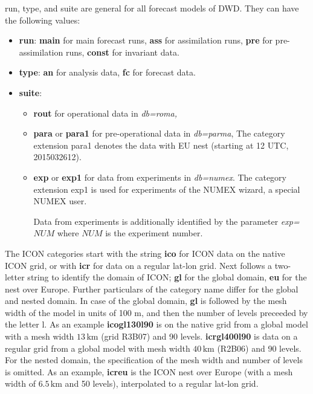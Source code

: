 run, type, and suite are general for all forecast models of DWD. They can have the 
following values:
\begin{itemize}
 \item \textbf{run}: \textbf{main} for main forecast runs,
                     \textbf{ass} for assimilation runs,
                     \textbf{pre} for pre-assimilation runs,
                     \textbf{const} for invariant data.
 \item \textbf{type}: \textbf{an} for analysis data,
                      \textbf{fc} for forecast data.
 \item \textbf{suite}: 
       \begin{itemize}
         \item \textbf{rout} for operational data in \emph{db=roma,}
         \item \textbf{para} or \textbf{para1} for pre-operational data in \emph{db=parma},
                       The category extension para1 denotes the data with EU nest
                       (starting at 12 UTC, 2015032612).
         \item \textbf{exp} or \textbf{exp1} for data from experiments in
                       \emph{db=numex}. The category extension exp1 is used for
                       experiments of the NUMEX wizard, a special NUMEX user.

                       Data from experiments is additionally
                       identified by the parameter \emph{exp=}$NUM$ where $NUM$ is
                       the experiment number.
       \end{itemize}
\end{itemize}

The ICON categories start with the string \textbf{ico} for ICON data on 
the native ICON grid, or with \textbf{icr} for data on a regular lat-lon grid.
Next follows a two-letter string to identify the domain of ICON; \textbf{gl} for the
global domain, \textbf{eu} for the nest over Europe. Further particulars of the category 
name differ for the global and nested domain. In case of the global domain, \textbf{gl} 
is followed by the mesh width of the model in units of 100 m, and then the number of levels 
preceeded by the letter l. As an example \textbf{icogl130l90} is on the native grid from a global 
model with a mesh width $13\,\mathrm{km}$ (grid R3B07) and 90 levels. \textbf{icrgl400l90} is data 
on a regular grid from a global model with mesh width $40\,\mathrm{km}$ (R2B06) and 90 levels. 
For the nested domain, the specification of the mesh width and number of levels is omitted. As an 
example, \textbf{icreu} is the ICON nest over Europe (with a mesh width of $6.5\,\mathrm{km}$ and 50 
levels), interpolated to a regular lat-lon grid.

